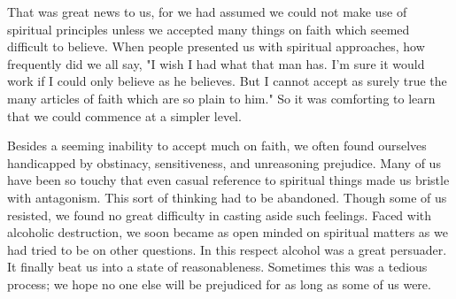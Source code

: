 \begin{biblechapter}
    That was great news to us, 
for we had assumed we could not make use of spiritual principles 
unless we accepted many things on faith 
which seemed difficult to believe. 
When people presented us with spiritual approaches, 
how frequently did we all say, 
"I wish I had what that man has. 
I'm sure it would work if I could only believe as he believes. 
But I cannot accept as surely true the many articles of faith which are so plain to him." 
So it was comforting to learn that we could commence at a simpler level.

Besides a seeming inability to accept much on faith, 
we often found ourselves handicapped by obstinacy, sensitiveness, and unreasoning prejudice. 
Many of us have been so touchy that even casual reference to spiritual things made us bristle with antagonism. 
This sort of thinking had to be abandoned. 
Though some of us resisted, we found no great difficulty in casting aside such feelings. 
Faced with alcoholic destruction, 
we soon became as open minded on spiritual matters as we had tried to be on other questions. 
In this respect alcohol was a great persuader. 
It finally beat us into a state of reasonableness. 
Sometimes this was a tedious process; 
we hope no one else will be prejudiced for as long as some of us were.
\end{biblechapter}



